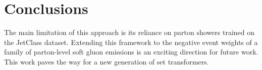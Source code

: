 \section{Conclusions}\label{sec:conclusions}

The main limitation of this approach is its reliance on parton showers
trained on the JetClass dataset. Extending this framework to the
negative event weights of a family of parton-level soft gluon emissions
is an exciting direction for future work. This work paves the way for a
new generation of set transformers.

